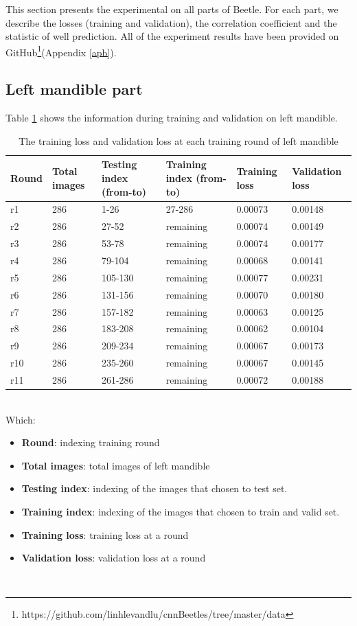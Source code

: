 \documentclass[12pt,a4paper]{article}
\begin{document}
This section presents the experimental on all parts of Beetle. For each part, we describe the losses (training and validation), the correlation coefficient and the statistic of well prediction. All of the experiment results have been provided on GitHub\footnote{https://github.com/linhlevandlu/cnnBeetles/tree/master/data}(Appendix \ref{apb}).
\pagebreak
\subsection{Left mandible part}
Table \ref{mgloss} shows the information during training and validation on left mandible.
\begin{table}[h!]
	\centering
	\begin{tabular}{l p{2cm} p{2.4cm} p{2.6cm} p{2.2cm} p{2.2cm}}
	Round & Total images & Testing index (from-to) & Training index (from-to) & Training loss & Validation loss \\ \hline
	r1 & 286 & 1-26 & 27-286 & 0.00073 & 0.00148 \\ \hline
	r2 & 286 & 27-52 & remaining & 0.00074 & 0.00149 \\ \hline
	r3 & 286 & 53-78 & remaining & 0.00074 & 0.00177 \\ \hline
	r4 & 286 & 79-104 & remaining & 0.00068 & 0.00141 \\ \hline
	r5 & 286 & 105-130 & remaining & 0.00077 & 0.00231 \\ \hline
	r6 & 286 & 131-156 & remaining & 0.00070 & 0.00180 \\ \hline
	r7 & 286 & 157-182 & remaining & 0.00063 & 0.00125 \\ \hline
	r8 & 286 & 183-208 & remaining & 0.00062 & 0.00104 \\ \hline
	r9 & 286 & 209-234 & remaining & 0.00067 & 0.00173 \\ \hline	
	r10 & 286 & 235-260 & remaining & 0.00067 & 0.00145 \\ \hline
	r11 & 286 & 261-286 & remaining & 0.00072 & 0.00188 \\ \hline
	\end{tabular}
	\caption{The training loss and validation loss at each training round of left mandible}
	\label{mgloss}
\end{table}~\\
Which:
\begin{itemize}
	\item \textbf{Round}: indexing training round
	\item \textbf{Total images}: total images of left mandible
	\item \textbf{Testing index}: indexing of the images that chosen to test set.
	\item \textbf{Training index}: indexing of the images that chosen to train and valid set.
	\item \textbf{Training loss}: training loss at a round
	\item \textbf{Validation loss}: validation loss at a round
\end{itemize}~\\
\end{document}
